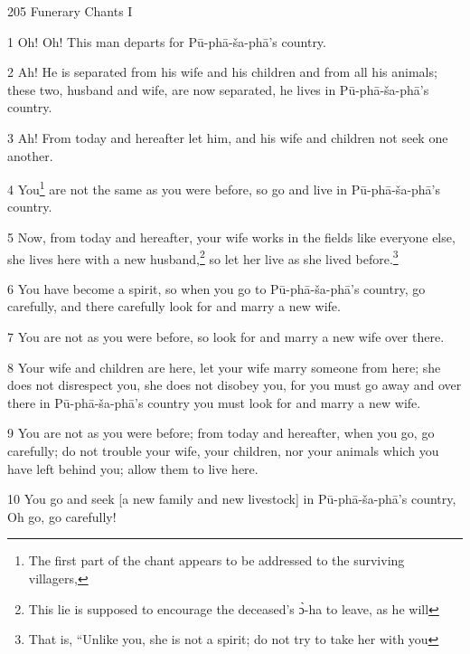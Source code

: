 
205 Funerary Chants I

1 Oh! Oh! This man departs for Pū-phā-ša-phā's country.

2 Ah! He is separated from his wife and his children and from all his animals;
these two, husband and wife, are now separated, he lives in Pū-phā-ša-phā's
country.

3 Ah! From today and hereafter let him, and his wife and children not seek one
another.

4 You\footnote{The first part of the chant appears to be addressed to the surviving villagers,} are not the same as you were before, so go and live in Pū-phā-ša-phā's
country.

5 Now, from today and hereafter, your wife works in the fields like everyone else,
she lives here with a new husband,\footnote{This lie is supposed to encourage the deceased's ɔ̀-ha to leave, as he will} so let her live as she lived before.\footnote{That is, ``Unlike you, she is not a spirit; do not try to take her with you}

6 You have become a spirit, so when you go to Pū-phā-ša-phā's country, go
carefully, and there carefully look for and marry a new wife.

7 You are not as you were before, so look for and marry a new wife over there.

8 Your wife and children are here, let your wife marry someone from here; she does
not disrespect you, she does not disobey you, for you must go away and over there
in Pū-phā-ša-phā's country you must look for and marry a new wife.

9 You are not as you were before; from today and hereafter, when you go, go carefully;
do not trouble your wife, your children, nor your animals which you have left behind
you; allow them to live here.

10 You go and seek [a new family and new livestock] in Pū-phā-ša-phā's country,
Oh go, go carefully!

